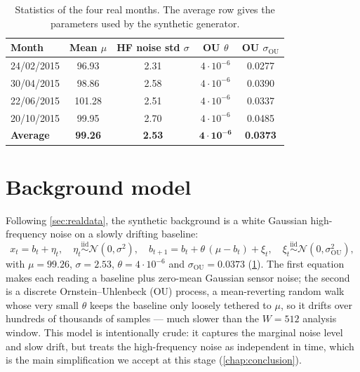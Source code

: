 \begin{table}[H]
    \centering
    \footnotesize
    \begin{tabular}{lcccc}
        \toprule
        Month & Mean $\mu$ & HF noise std $\sigma$ & OU $\theta$ & OU $\sigma_{\mathrm{OU}}$ \\
        \midrule
        24/02/2015 & 96.93  & 2.31 & $4\cdot 10^{-6}$ & 0.0277 \\
        30/04/2015 & 98.86  & 2.58 & $4\cdot 10^{-6}$ & 0.0390 \\
        22/06/2015 & 101.28 & 2.51 & $4\cdot 10^{-6}$ & 0.0337 \\
        20/10/2015 & 99.95  & 2.70 & $4\cdot 10^{-6}$ & 0.0485 \\
        \midrule
        \textbf{Average} & \textbf{99.26} & \textbf{2.53} &
        $\mathbf{4\cdot 10^{-6}}$ & \textbf{0.0373} \\
        \bottomrule
    \end{tabular}
    \caption{Statistics of the four real months. The average row gives the
    parameters used by the synthetic generator.}
    \label{tab:real-stats}
\end{table}

\section{Background model}
\label{sec:noise}

Following \cref{sec:realdata}, the synthetic background is a white Gaussian
high-frequency noise on a slowly drifting baseline:
\begin{equation}
    x_t = b_t + \eta_t, \quad
    \eta_t \overset{\text{iid}}{\sim} \mathcal{N}(0,\sigma^2), \quad
    b_{t+1} = b_t + \theta\,(\mu - b_t) + \xi_t, \quad
    \xi_t \overset{\text{iid}}{\sim} \mathcal{N}(0,\sigma_{\mathrm{OU}}^2),
    \label{eq:noise-model}
\end{equation}
with $\mu = 99.26$, $\sigma = 2.53$, $\theta = 4\cdot 10^{-6}$ and
$\sigma_{\mathrm{OU}} = 0.0373$ (\cref{tab:real-stats}). The first equation makes
each reading a baseline plus zero-mean Gaussian sensor noise; the second is a
discrete Ornstein--Uhlenbeck (OU) process, a mean-reverting random walk whose
very small $\theta$ keeps the baseline only loosely tethered to $\mu$, so it
drifts over hundreds of thousands of samples --- much slower than the $W=512$
analysis window. This model is intentionally crude: it captures the marginal
noise level and slow drift, but treats the high-frequency noise as independent in
time, which is the main simplification we accept at this stage
(\cref{chap:conclusion}).

